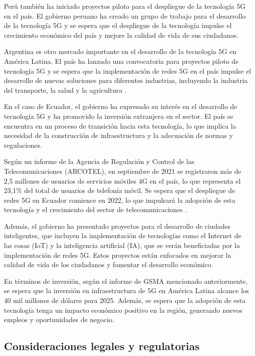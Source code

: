 \documentclass[12pt]{article}
\begin{document}
            Perú también ha iniciado proyectos piloto para el despliegue de la tecnología 5G en el país. El gobierno peruano ha creado un grupo de trabajo para el desarrollo de la tecnología 5G y se espera que el despliegue de la tecnología impulse el crecimiento económico del país y mejore la calidad de vida de sus ciudadanos.
            
            Argentina es otro mercado importante en el desarrollo de la tecnología 5G en América Latina. El país ha lanzado una convocatoria para proyectos piloto de tecnología 5G y se espera que la implementación de redes 5G en el país impulse el desarrollo de nuevas soluciones para diferentes industrias, incluyendo la industria del transporte, la salud y la agricultura \cite{garcia2018escenarios}.

            En el caso de Ecuador, el gobierno ha expresado su interés en el desarrollo de tecnología 5G y ha promovido la inversión extranjera en el sector. El país se encuentra en un proceso de transición hacia esta tecnología, lo que implica la necesidad de la construcción de infraestructura y la adecuación de normas y regulaciones.

            Según un informe de la Agencia de Regulación y Control de las Telecomunicaciones (ARCOTEL), en septiembre de 2021 se registraron más de 2,5 millones de usuarios de servicios móviles 4G en el país, lo que representa el 23,1\% del total de usuarios de telefonía móvil. Se espera que el despliegue de redes 5G en Ecuador comience en 2022, lo que impulsará la adopción de esta tecnología y el crecimiento del sector de telecomunicaciones \cite{garcia2018escenarios}.
            
            Además, el gobierno ha presentado proyectos para el desarrollo de ciudades inteligentes, que incluyen la implementación de tecnologías como el Internet de las cosas (IoT) y la inteligencia artificial (IA), que se verán beneficiadas por la implementación de redes 5G. Estos proyectos están enfocados en mejorar la calidad de vida de los ciudadanos y fomentar el desarrollo económico.
            
            En términos de inversión, según el informe de GSMA mencionado anteriormente, se espera que la inversión en infraestructura de 5G en América Latina alcance los 40 mil millones de dólares para 2025. Además, se espera que la adopción de esta tecnología tenga un impacto económico positivo en la región, generando nuevos empleos y oportunidades de negocio.

        \subsection{Consideraciones legales y regulatorias}
\end{document}

